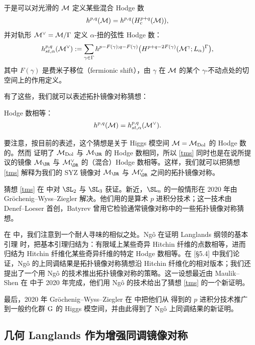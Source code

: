 于是可以对光滑的 ${\mathcal{M}}$ 定义某些混合 Hodge 数
\[
h^{p,q}({\mathcal{M}})=h^{p,q}(H^{p+q}_c({\mathcal{M}})),
\]
并对轨形 ${\mathcal{M}}^\vee={\mathcal{M}}/\Gamma$ 定义 $\alpha$-扭的弦性 Hodge 数：
\[
h_{st,\alpha}^{p,q}({\mathcal{M}}^\vee):=\sum_{\gamma\in \Gamma} h^{p-F(\gamma);q-F(\gamma)}\bigl(H^{p+q-2F(\gamma)}({\mathcal{M}}^\gamma;L_{\alpha})^\Gamma\bigr),
\]
其中 $F(\gamma)$ 是费米子移位（fermionic shift），由 $\gamma$ 在 ${\mathcal{M}}$ 的某个 $\gamma$-不动点处的切空间上的作用定义。

有了这些，我们就可以表述拓扑镜像对称猜想：

\begin{conjecture}\label{tms}
Hodge 数相等：
\[
h^{p,q}({\mathcal{M}})=h_{st,\alpha}^{p,q}({\mathcal{M}}^\vee).
\]
\end{conjecture}

要注意，按目前的表述，这个猜想是关于 Higgs 模空间 ${\mathcal{M}}={\mathcal{M}}_{{\mathrm{Dol}}}$ 的 Hodge 数的。然而 \cite{hausel-thaddeus} 证明了 ${\mathcal{M}}_{\mathrm{Dol}}$ 与 $\M_{\DR}$ 的 Hodge 数相同，所以 \eqref{tms} 同时也是在说所提议的镜像 $\M_{\DR}$ 与 $\M^\vee_{\DR}$ 的（混合）Hodge 数相等。这样，我们就可以把猜想 \ref{tms} 解释为我们的 SYZ 镜像对 $\M_{\DR}$ 与 $\M^\vee_{\DR}$ 之间的拓扑镜像对称。

猜想 \ref{tms} 在 \cite{hausel-thaddeus} 中对 $\SL_2$ 与 $\SL_3$ 获证。新近，$\SL_n$ 的一般情形在 2020 年由 Gr\"ochenig--Wyss--Ziegler \cite{groechenig-etal1} 解决。他们用的是算术 $p$ 进积分技术；这一技术由 Denef--Loeser \cite{denef-loeser} 首创，Batyrev \cite{batyrev2} 曾用它检验通常镜像对称中的一些拓扑镜像对称猜想。

在 \cite{hausel-gths} 中，我们注意到一个耐人寻味的相似之处。Ng\^{o} 在证明 Langlands 纲领的基本引理 \cite{ngo} 时，把基本引理归结为：有限域上某些奇异 Hitchin 纤维的点数相等，进而归结为 Hitchin 纤维化某些奇异纤维的特定 Hodge 数相等。在 \cite{hausel-gths}[\S 5.4] 中我们论证，Ng\^{o} 的上同调结果是拓扑镜像对称猜想沿 Hitchin 纤维化的相对版本；我们还提出了一个用 Ng\^{o} 的技术推出拓扑镜像对称的策略。这一设想最近由 Maulik--Shen 在 \cite{maulik-shen} 中于 2020 年完成，他们用 Ng\^{o} 的技术给出了猜想 \ref{tms} 的一个新证明。

最后，2020 年 Gr\"ochenig--Wyss--Ziegler 在 \cite{groechenig-etal2} 中把他们从 \cite{groechenig-etal1} 得到的 $p$ 进积分技术推广到一般约化群 $\mathrm{G}$ 的 Higgs 模空间，并由此得到了 Ng\^{o} 上同调结果的新证明。

\subsection{几何 Langlands 作为增强同调镜像对称}\label{gls}

